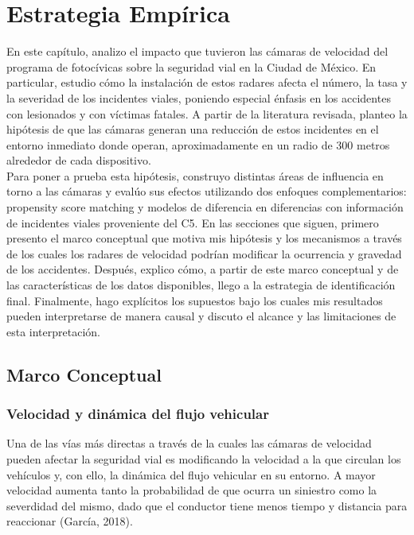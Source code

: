 \chapter{Estrategia Empírica}

\noindent En este capítulo, analizo el impacto que tuvieron las cámaras de velocidad del programa de fotocívicas sobre la seguridad vial en la Ciudad de México. En particular, estudio cómo la instalación de estos radares afecta el número, la tasa y la severidad de los incidentes viales, poniendo especial énfasis en los accidentes con lesionados y con víctimas fatales. A partir de la literatura revisada, planteo la hipótesis de que las cámaras generan una reducción de estos incidentes en el entorno inmediato donde operan, aproximadamente en un radio de 300 metros alrededor de cada dispositivo.\\

Para poner a prueba esta hipótesis, construyo distintas áreas de influencia en torno a las cámaras y evalúo sus efectos utilizando dos enfoques complementarios: propensity score matching y modelos de diferencia en diferencias con información de incidentes viales proveniente del C5. En las secciones que siguen, primero presento el marco conceptual que motiva mis hipótesis y los mecanismos a través de los cuales los radares de velocidad podrían modificar la ocurrencia y gravedad de los accidentes. Después, explico cómo, a partir de este marco conceptual y de las características de los datos disponibles, llego a la estrategia de identificación final. Finalmente, hago explícitos los supuestos bajo los cuales mis resultados pueden interpretarse de manera causal y discuto el alcance y las limitaciones de esta interpretación.\\

\section{Marco Conceptual}
\subsection{Velocidad y dinámica del flujo vehicular}
\noindent Una de las vías más directas a través de la cuales las cámaras de velocidad pueden afectar la seguridad vial es modificando la velocidad a la que circulan los vehículos y, con ello, la dinámica del flujo vehicular en su entorno. A mayor velocidad aumenta tanto la probabilidad de que ocurra un siniestro como la severdidad del mismo, dado que el conductor tiene menos tiempo y distancia para reaccionar (García, 2018).\\

